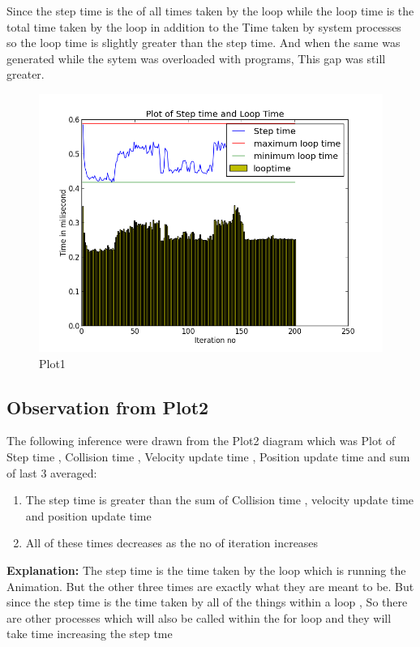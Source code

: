 \documentclass[11pt]{article}
\begin{document}
Since the step time is the of all times taken by the loop while the loop time is the total time taken by the loop in addition to the Time 
taken by system processes so the loop time is slightly greater than the step time. And when the same was generated while the sytem was overloaded 
with programs, This gap was still greater.
\begin{figure}[!ht]
	\centering
	\caption{Plot1}
		\includegraphics[scale=0.5]{../plots/g17_plot01.png}
\end{figure}
\subsection{Observation from Plot2}
The following inference were drawn from the Plot2 diagram which was Plot of Step time , Collision time , Velocity update time , Position update time
and sum of last 3 averaged:
\begin{enumerate}
    \item The step time is greater than the sum of Collision time , velocity update time and position update time
    \item All of these times decreases as the no of iteration increases
\end{enumerate}
\textbf{Explanation:}
The step time is the time taken by the loop which is running the Animation. But the other three times are exactly what they are meant to be.
But since the step time is the time taken by all of the things within a loop , So there are other processes which will also be called within the for loop 
and they will take time increasing the step tme\\
\end{document}
